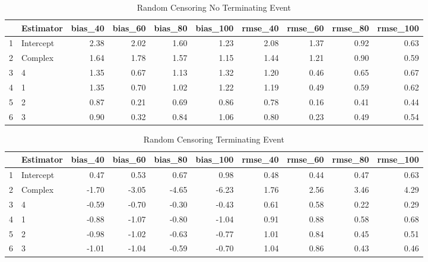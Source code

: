 \begin{table}[ht]
\centering
\begin{tabular}{rlrrrrrrrr}
  \hline
 & Estimator & bias\_40 & bias\_60 & bias\_80 & bias\_100 & rmse\_40 & rmse\_60 & rmse\_80 & rmse\_100 \\ 
  \hline
1 & Intercept & 2.38 & 2.02 & 1.60 & 1.23 & 2.08 & 1.37 & 0.92 & 0.63 \\ 
  2 & Complex & 1.64 & 1.78 & 1.57 & 1.15 & 1.44 & 1.21 & 0.90 & 0.59 \\ 
  3 & 4 & 1.35 & 0.67 & 1.13 & 1.32 & 1.20 & 0.46 & 0.65 & 0.67 \\ 
  4 & 1 & 1.35 & 0.70 & 1.02 & 1.22 & 1.19 & 0.49 & 0.59 & 0.62 \\ 
  5 & 2 & 0.87 & 0.21 & 0.69 & 0.86 & 0.78 & 0.16 & 0.41 & 0.44 \\ 
  6 & 3 & 0.90 & 0.32 & 0.84 & 1.06 & 0.80 & 0.23 & 0.49 & 0.54 \\ 
   \hline
\end{tabular}
\caption{Random Censoring 
 No Terminating Event} 
\end{table}
\begin{table}[ht]
\centering
\begin{tabular}{rlrrrrrrrr}
  \hline
 & Estimator & bias\_40 & bias\_60 & bias\_80 & bias\_100 & rmse\_40 & rmse\_60 & rmse\_80 & rmse\_100 \\ 
  \hline
1 & Intercept & 0.47 & 0.53 & 0.67 & 0.98 & 0.48 & 0.44 & 0.47 & 0.63 \\ 
  2 & Complex & -1.70 & -3.05 & -4.65 & -6.23 & 1.76 & 2.56 & 3.46 & 4.29 \\ 
  3 & 4 & -0.59 & -0.70 & -0.30 & -0.43 & 0.61 & 0.58 & 0.22 & 0.29 \\ 
  4 & 1 & -0.88 & -1.07 & -0.80 & -1.04 & 0.91 & 0.88 & 0.58 & 0.68 \\ 
  5 & 2 & -0.98 & -1.02 & -0.63 & -0.77 & 1.01 & 0.84 & 0.45 & 0.51 \\ 
  6 & 3 & -1.01 & -1.04 & -0.59 & -0.70 & 1.04 & 0.86 & 0.43 & 0.46 \\ 
   \hline
\end{tabular}
\caption{Random Censoring 
 Terminating Event} 
\end{table}
